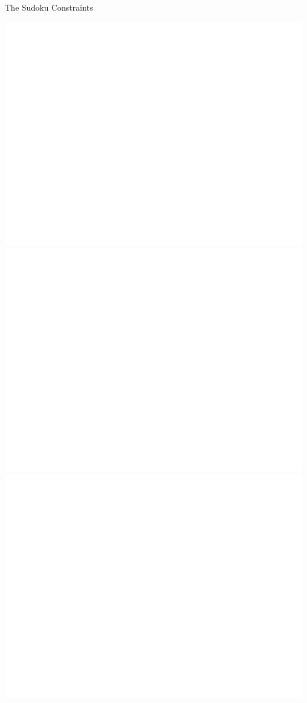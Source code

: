 \documentclass{beamer}
\begin{document}
\begin{frame}{The Sudoku Constraints}
\begin{overprint}
 \includegraphics[width=\textwidth]{isvalid4}
 \includegraphics[width=\textwidth]{isvalid5}
 \includegraphics[width=\textwidth]{isvalid6}

\end{overprint}
\end{frame}
\end{document}

